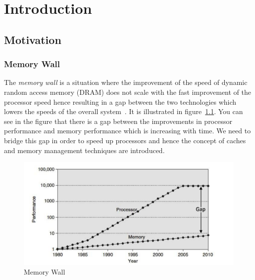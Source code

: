 \documentclass{listhesis}
\begin{document}
\chapter{Introduction}
\section{Motivation}
\subsection{Memory Wall}
The \textit{memory wall} is a situation where the improvement of the speed of dynamic random access memory (DRAM) does not scale with the fast improvement of the processor speed hence resulting in a gap between the two technologies which lowers the speeds of the overall system~\cite{memorywall}. It is illustrated in figure~\ref{fig:memorywall}. You can see in the figure that there is a gap between the improvements in processor performance and memory performance which is increasing with time. We need to bridge this gap in order to speed up processors and hence the concept of caches and memory management techniques are introduced.\\
\begin{figure}[h!]
  \includegraphics[width=\linewidth]{memorywall.png}
  \centering
  \caption{Memory Wall~\cite{hennessy}}
  \label{fig:memorywall}
\end{figure}
\end{document}
